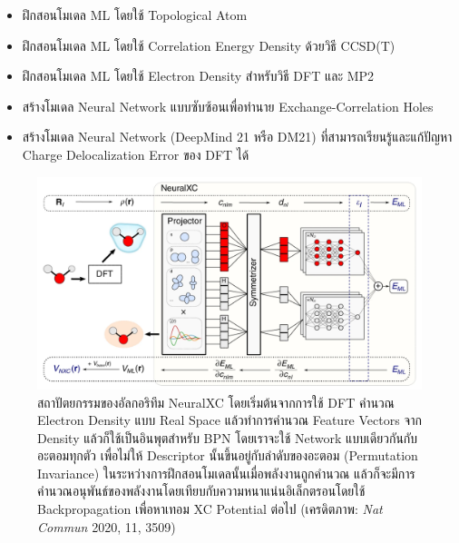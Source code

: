 \begin{itemize}
    \item ฝึกสอนโมเดล ML โดยใช้ Topological Atom\autocite{mcdonagh2018}
    
    \item ฝึกสอนโมเดล ML โดยใช้ Correlation Energy Density ด้วยวิธี CCSD(T)\autocite{nudejima2019}
    
    \item ฝึกสอนโมเดล ML โดยใช้ Electron Density สำหรับวิธี DFT\autocite{dick2020} และ MP2\autocite{han2021} 
    
    \item สร้างโมเดล Neural Network แบบซับซ้อนเพื่อทำนาย Exchange-Correlation Holes\autocite{cuierrier2021,cuierrier2022}
    
    \item สร้างโมเดล Neural Network (DeepMind 21 หรือ DM21) ที่สามารถเรียนรู้และแก้ปัญหา Charge Delocalization Error 
    ของ DFT ได้\autocite{kirkpatrick2021}
\end{itemize}

\begin{figure}[H]
    \centering
    \includegraphics[width=\linewidth]{fig/neuralxc.png}
    \caption{สถาปัตยกรรมของอัลกอริทึม NeuralXC โดยเริ่มต้นจากการใช้ DFT คำนวณ Electron Density แบบ Real Space 
    แล้วทำการคำนวณ Feature Vectors จาก Density แล้วก็ใช้เป็นอินพุตสำหรับ BPN โดยเราจะใช้ Network แบบเดียวกันกับอะตอมทุกตัว%
    เพื่อไม่ให้ Descriptor นั้นขึ้นอยู่กับลำดับของอะตอม (Permutation Invariance) ในระหว่างการฝึกสอนโมเดลนั้นเมื่อพลังงานถูกคำนวณ%
    แล้วก็จะมีการคำนวณอนุพันธ์ของพลังงานโดยเทียบกับความหนาแน่นอิเล็กตรอนโดยใช้ Backpropagation เพื่อหาเทอม XC Potential 
    ต่อไป (เครดิตภาพ: \textit{Nat Commun} 2020, 11, 3509)}
    \label{fig:neuralxc}
\end{figure}

